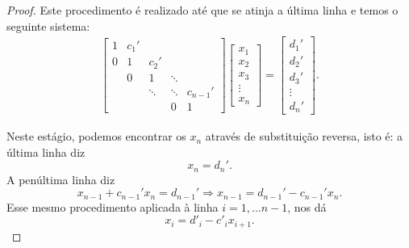 \begin{proof}
Este procedimento é realizado até que se atinja a última linha e temos o seguinte sistema:
\begin{eqnarray*} \begin{bmatrix}
   {1} & {c_1'} & {   } & {   } & {   } \\
   {0} & {1} & {c_2'} & {   } & {   } \\
   {   } & { 0 } & {1} & \ddots & {   } \\
   {   } & {   } & \ddots & \ddots & {c_{n-1}'}\\
   {   } & {   } & {   } & { 0 } & { 1 }
\end{bmatrix}
\begin{bmatrix}
   {x_1 }  \\
   {x_2 }  \\
   {x_3 }  \\
   \vdots   \\
   {x_n }  
\end{bmatrix}
=
\begin{bmatrix}
   {d_1' }  \\
   {d_2' }  \\
   {d_3'}  \\
   \vdots   \\
   {d_n' }  
\end{bmatrix}.
\end{eqnarray*}

Neste estágio, podemos encontrar os $x_n$ através de substituição reversa, isto é: a última linha diz $$x_n=d_n'.$$
A penúltima linha diz $$x_{n-1}+c_{n-1}'x_n=d_{n-1}' \Longrightarrow x_{n-1}=d_{n-1}'-c_{n-1}'x_{n}.$$
Esse mesmo procedimento aplicada à linha $i=1,\ldots n-1$, nos dá $$x_i = d'_i - c'_i x_{i + 1}. $$
\end{proof}

